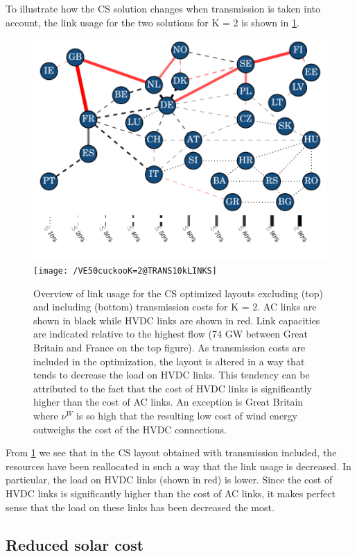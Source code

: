 \documentclass[a4paper, 12pt, sort&compress]{elsarticle}%
\begin{document}
To illustrate how the CS solution changes when transmission is taken
into account, the link usage for the two solutions for K = 2 is shown
in \cref{fig:links}.

\begin{figure}[h!]
  \centering
  \includegraphics[width = 0.8\columnwidth]{VE50cuckooK=2@defaultLINKS}
  \texttt{[image: /VE50cuckooK=2@TRANS10kLINKS]}
  \caption{Overview of link usage for the CS optimized layouts
    excluding (top) and including (bottom) transmission costs for K =
    2. AC links are shown in black while HVDC links are shown in
    red. Link capacities are indicated relative to the highest flow
    (74 GW between Great Britain and France on the top figure). As
    transmission costs are included in the optimization, the layout is
    altered in a way that tends to decrease the load on HVDC links. This
    tendency can be attributed to the fact that the cost of HVDC links
    is significantly higher than the cost of AC links. An exception is
    Great Britain where $\nu^{W}$ is so high that the resulting low cost
    of wind energy outweighs the cost of the HVDC connections.}
  \label{fig:links}
\end{figure}

From \cref{fig:links} we see that in the CS layout obtained with
transmission included, the resources have been reallocated in such a
way that the link usage is decreased. In particular, the load on HVDC
links (shown in red) is lower. Since the cost of HVDC links is
significantly higher than the cost of AC links, it makes perfect sense
that the load on these links has been decreased the most.

\FloatBarrier

\subsection{Reduced solar cost}
\label{sec:reduced-solar-cost}
\end{document}
